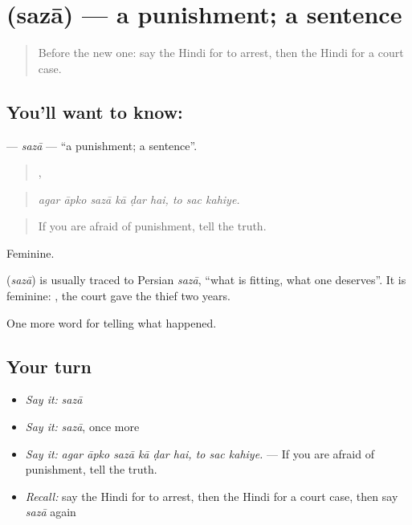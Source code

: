 \section[\texorpdfstring{\hi{सज़ा} (sazā)}{सज़ा (sazā)}]{ (sazā) — a punishment; a sentence}

\label{lesson:HI-C295-saza}



\begin{quote}
Before the new one: say the Hindi for to arrest, then the Hindi for a court case.
\end{quote}

\subsection*{You'll want to know: }
\textbf{} — \emph{sazā} — \textquotedblleft{}a punishment; a sentence\textquotedblright{}.

\begin{quote}
     ,   
\end{quote}

\begin{quote}
\emph{agar āpko sazā kā ḍar hai, to sac kahiye.}
\end{quote}

\begin{quote}
If you are afraid of punishment, tell the truth.
\end{quote}

Feminine.

\begin{cousinweb}
\textbf{} (\emph{sazā}) is usually traced to Persian \emph{sazā}, \textquotedblleft{}what is fitting, what one deserves\textquotedblright{}. It is feminine: \textbf{        }, the court gave the thief two years.
\end{cousinweb}

\begin{grammarlens}[title={What you've built}]
One more word for telling what happened.
\end{grammarlens}

\subsection*{Your turn}
\begin{itemize}
\raggedright
  \item \emph{Say it:} \emph{sazā}
  \item \emph{Say it:} \emph{sazā}, once more
  \item \emph{Say it:} \emph{agar āpko sazā kā ḍar hai, to sac kahiye.} — If you are afraid of punishment, tell the truth.
  \item \emph{Recall:} say the Hindi for to arrest, then the Hindi for a court case, then say \emph{sazā} again
\end{itemize}

